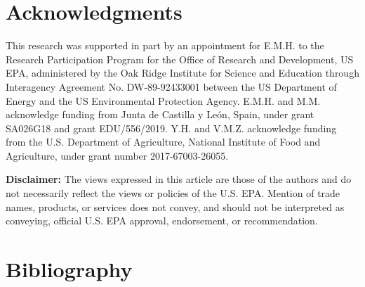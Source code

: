 \begin{refsection}[referencesCh5]
\section*{Acknowledgments} \label{section:AcknowledgmentsIncentives}
This research was supported in part by an appointment for E.M.H. to the Research Participation Program for the Office of Research and Development, US EPA, administered by the Oak Ridge Institute for Science and Education through Interagency Agreement No. DW-89-92433001 between the US Department of Energy and the US Environmental Protection Agency. E.M.H. and M.M. acknowledge funding from Junta de Castilla y Le\'{o}n, Spain, under grant SA026G18 and grant EDU/556/2019. Y.H. and V.M.Z. acknowledge funding from the U.S. Department of Agriculture, National Institute of Food and Agriculture, under grant number 2017-67003-26055.

\textbf{Disclaimer:} The views expressed in this article are those of the authors and do not necessarily reflect the views or policies of the U.S. EPA. Mention of trade names, products, or services does not convey, and should not be interpreted as conveying, official U.S. EPA approval, endorsement, or recommendation.

\section*{Bibliography}

\printbibliography[heading=none]
\end{refsection}